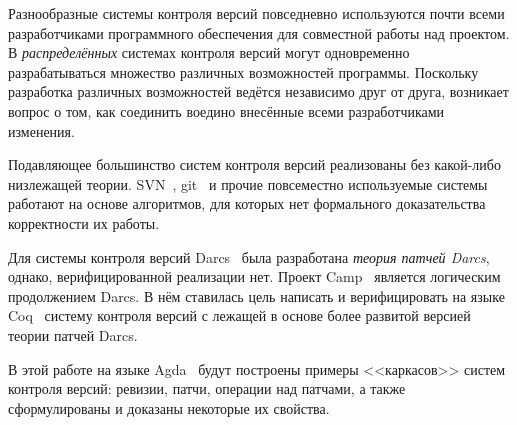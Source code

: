 \startprefacepage

Разнообразные системы контроля версий повседневно используются почти
всеми разработчиками программного обеспечения для совместной работы
над проектом. В \emph{распределённых} системах контроля версий могут
одновременно разрабатываться множество различных возможностей
программы. Поскольку разработка различных возможностей ведётся
независимо друг от друга, возникает вопрос о том, как соединить
воедино внесённые всеми разработчиками изменения.

Подавляющее большинство систем контроля версий реализованы без
какой-либо низлежащей теории. SVN~\cite{svnbook}, git~\cite{git} и
прочие повсеместно используемые системы работают на основе алгоритмов,
для которых нет формального доказательства корректности их работы.

Для системы контроля версий Darcs~\cite{darcs} была разработана
\emph{теория патчей Darcs}, однако, верифицированной реализации нет.
Проект Camp~\cite{camp} является логическим продолжением Darcs. В нём
ставилась цель написать и верифицировать на языке Coq~\cite{coq}
систему контроля версий с лежащей в основе более развитой версией
теории патчей Darcs.

В этой работе на языке Agda~\cite{agda} будут построены примеры
<<каркасов>> систем контроля версий: ревизии, патчи, операции над
патчами, а также сформулированы и доказаны некоторые их свойства.


